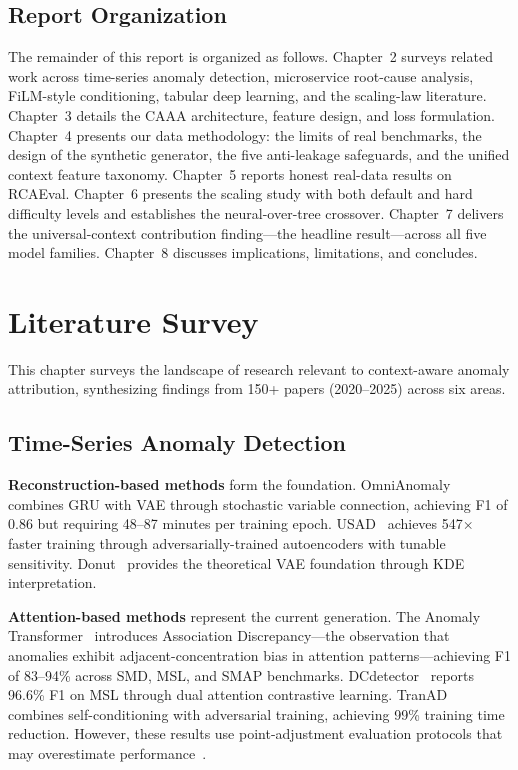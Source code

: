 \documentclass[12pt,a4paper]{report}
\newcommand{\sys}{CAAA}
\begin{document}
\section{Report Organization}

The remainder of this report is organized as follows. Chapter~2 surveys related work across time-series anomaly detection, microservice root-cause analysis, FiLM-style conditioning, tabular deep learning, and the scaling-law literature. Chapter~3 details the \sys{} architecture, feature design, and loss formulation. Chapter~4 presents our data methodology: the limits of real benchmarks, the design of the synthetic generator, the five anti-leakage safeguards, and the unified context feature taxonomy. Chapter~5 reports honest real-data results on RCAEval. Chapter~6 presents the scaling study with both default and hard difficulty levels and establishes the neural-over-tree crossover. Chapter~7 delivers the universal-context contribution finding---the headline result---across all five model families. Chapter~8 discusses implications, limitations, and concludes.


\chapter{Literature Survey}

This chapter surveys the landscape of research relevant to context-aware anomaly attribution, synthesizing findings from 150+ papers (2020--2025) across six areas.

\section{Time-Series Anomaly Detection}

\textbf{Reconstruction-based methods} form the foundation. OmniAnomaly~\cite{su2019omnianomaly} combines GRU with VAE through stochastic variable connection, achieving F1 of 0.86 but requiring 48--87 minutes per training epoch. USAD~\cite{audibert2020usad} achieves 547$\times$ faster training through adversarially-trained autoencoders with tunable sensitivity. Donut~\cite{xu2018donut} provides the theoretical VAE foundation through KDE interpretation.

\textbf{Attention-based methods} represent the current generation. The Anomaly Transformer~\cite{xu2022anomalytransformer} introduces Association Discrepancy---the observation that anomalies exhibit adjacent-concentration bias in attention patterns---achieving F1 of 83--94\% across SMD, MSL, and SMAP benchmarks. DCdetector~\cite{yang2023dcdetector} reports 96.6\% F1 on MSL through dual attention contrastive learning. TranAD~\cite{tuli2022tranad} combines self-conditioning with adversarial training, achieving 99\% training time reduction. However, these results use point-adjustment evaluation protocols that may overestimate performance~\cite{pham2024rcaeval}.
\end{document}
